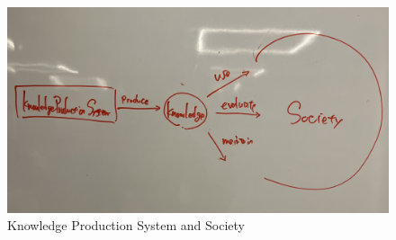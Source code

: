\begin{figure}[htb]
    \centering
    \includegraphics[width=\linewidth]{figs/research_process_society.jpg}
    \caption{Knowledge Production System and Society}
    \label{fig:research_process_society}
\end{figure}










